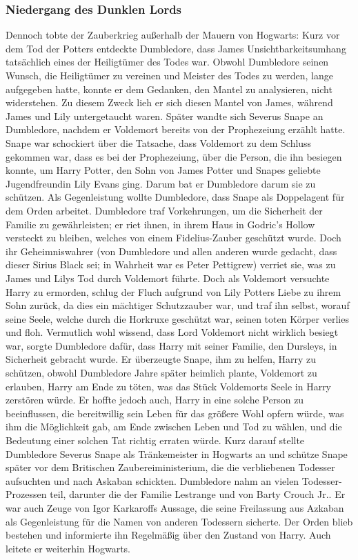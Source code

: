 \documentclass[a4paper, 10pt]{article}
\begin{document}
\subsubsection*{Niedergang des Dunklen Lords}
Dennoch tobte der Zauberkrieg außerhalb der Mauern von Hogwarts: Kurz vor dem Tod der Potters entdeckte Dumbledore, dass James Unsichtbarkeitsumhang tatsächlich eines der Heiligtümer des Todes war. Obwohl Dumbledore seinen Wunsch, die Heiligtümer zu vereinen und Meister des Todes zu werden, lange aufgegeben hatte, konnte er dem Gedanken, den Mantel zu analysieren, nicht widerstehen. Zu diesem Zweck lieh er sich diesen Mantel von James, während James und Lily untergetaucht waren. Später wandte sich Severus Snape an Dumbledore, nachdem er Voldemort bereits von der Prophezeiung erzählt hatte. Snape war schockiert über die Tatsache, dass Voldemort zu dem Schluss gekommen war, dass es bei der Prophezeiung, über die Person, die ihn besiegen konnte, um Harry Potter, den Sohn von James Potter und Snapes geliebte Jugendfreundin Lily Evans ging. Darum bat er Dumbledore darum sie zu schützen. Als Gegenleistung wollte Dumbledore, dass Snape als Doppelagent für dem Orden arbeitet.
\vspace{10pt}
\newline
Dumbledore traf Vorkehrungen, um die Sicherheit der Familie zu gewährleisten; er riet ihnen, in ihrem Haus in Godric's Hollow versteckt zu bleiben, welches von einem Fidelius-Zauber geschützt wurde. Doch ihr Geheimniswahrer (von Dumbledore und allen anderen wurde gedacht, dass dieser Sirius Black sei; in Wahrheit war es Peter Pettigrew) verriet sie, was zu James und Lilys Tod durch Voldemort führte. Doch als Voldemort versuchte Harry zu ermorden, schlug der Fluch aufgrund von Lily Potters Liebe zu ihrem Sohn zurück, da dies ein mächtiger Schutzzauber war, und traf ihn selbst, worauf seine Seele, welche durch die Horkruxe geschützt war, seinen toten Körper verlies und floh.
\vspace{10pt}
\newline
Vermutlich wohl wissend, dass Lord Voldemort nicht wirklich besiegt war, sorgte Dumbledore dafür, dass Harry mit seiner Familie, den Dursleys, in Sicherheit gebracht wurde. Er überzeugte Snape, ihm zu helfen, Harry zu schützen, obwohl Dumbledore Jahre später heimlich plante, Voldemort zu erlauben, Harry am Ende zu töten, was das Stück Voldemorts Seele in Harry zerstören würde. Er hoffte jedoch auch, Harry in eine solche Person zu beeinflussen, die bereitwillig sein Leben für das größere Wohl opfern würde, was ihm die Möglichkeit gab, am Ende zwischen Leben und Tod zu wählen, und die Bedeutung einer solchen Tat richtig erraten würde. Kurz darauf stellte Dumbledore Severus Snape als Tränkemeister in Hogwarts an und schütze Snape später vor dem Britischen Zaubereiministerium, die die verbliebenen Todesser aufsuchten und nach Askaban schickten. Dumbledore nahm an vielen Todesser-Prozessen teil, darunter die der Familie Lestrange und von Barty Crouch Jr.. Er war auch Zeuge von Igor Karkaroffs Aussage, die seine Freilassung aus Azkaban als Gegenleistung für die Namen von anderen Todessern sicherte. Der Orden blieb bestehen und informierte ihn Regelmäßig über den Zustand von Harry. Auch leitete er weiterhin Hogwarts.
\end{document}
